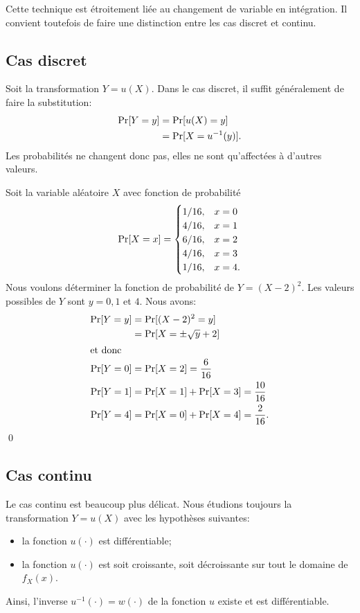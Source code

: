 Cette technique est étroitement liée au changement de variable en
intégration. Il convient toutefois de faire une distinction entre les
cas discret et continu.

\subsection{Cas discret}

Soit la transformation $Y = u(X)$. Dans le cas discret, il
suffit généralement de faire la substitution:
\begin{align*}
  \operatorname{Pr} [ Y = y ]
  &= \operatorname{Pr} [ u(X) = y ] \\
  &= \operatorname{Pr} [ X = u^{-1}(y) ].
\end{align*}
Les probabilités ne changent donc pas, elles ne sont qu'affectées à
d'autres valeurs.

\begin{exemple}
  Soit la variable aléatoire $X$ avec fonction de probabilité
  \begin{displaymath}
    \operatorname{Pr} [ X = x ] =
    \begin{cases}
      1/16, & x = 0 \\
      4/16, & x = 1 \\
      6/16, & x = 2 \\
      4/16, & x = 3 \\
      1/16, & x = 4.
    \end{cases}
  \end{displaymath}
  Nous voulons déterminer la fonction de probabilité de $Y = (X - 2)^2$. Les
  valeurs possibles de $Y$ sont $y = 0, 1$ et $4$. Nous avons:
  \begin{align*}
    \operatorname{Pr} [ Y = y ]
    &= \operatorname{Pr} [ (X - 2)^2 = y ] \\
    &= \operatorname{Pr} [ X = \pm \sqrt{y} + 2 ] \\
    \intertext{et donc}
    \operatorname{Pr} [ Y = 0 ]  &= \operatorname{Pr} [ X = 2 ] = \frac{6}{16} \\
    \operatorname{Pr} [ Y = 1 ]  &= \operatorname{Pr} [ X = 1 ] + \operatorname{Pr} [ X = 3 ]  = \frac{10}{16} \\
    \operatorname{Pr} [ Y = 4 ]  &= \operatorname{Pr} [ X = 0 ] + \operatorname{Pr} [ X = 4 ]  = \frac{2}{16}.
  \end{align*}
  \qed
\end{exemple}

\subsection{Cas continu}

Le cas continu est beaucoup plus délicat. Nous étudions toujours la
transformation $Y = u(X)$ avec les hypothèses suivantes:
\begin{itemize}
\item la fonction $u(\cdot)$ est différentiable;
\item la fonction $u(\cdot)$ est soit croissante, soit décroissante
  sur tout le domaine de $f_X(x)$.
\end{itemize}
Ainsi, l'inverse $u^{-1}(\cdot) = w(\cdot)$ de la fonction $u$ existe
et est différentiable.

